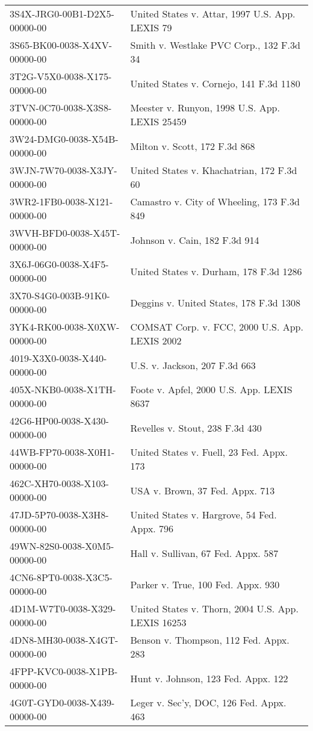 \documentclass[10pt, letterpaper]{article}
\begin{document}
\begin{spacing}{1.0}
\begin{longtable}{p{2.5in}p{4in}}
    3S4X-JRG0-00B1-D2X5-00000-00 & United States v. Attar, 1997 U.S. App. LEXIS 79\\
    3S65-BK00-0038-X4XV-00000-00 & Smith v. Westlake PVC Corp., 132 F.3d 34\\
    3T2G-V5X0-0038-X175-00000-00 & United States v. Cornejo, 141 F.3d 1180\\
    3TVN-0C70-0038-X3S8-00000-00 & Meester v. Runyon, 1998 U.S. App. LEXIS 25459\\
    3W24-DMG0-0038-X54B-00000-00 & Milton v. Scott, 172 F.3d 868\\
    3WJN-7W70-0038-X3JY-00000-00 & United States v. Khachatrian, 172 F.3d 60\\
    3WR2-1FB0-0038-X121-00000-00 & Camastro v. City of Wheeling, 173 F.3d 849\\
    3WVH-BFD0-0038-X45T-00000-00 & Johnson v. Cain, 182 F.3d 914\\
    3X6J-06G0-0038-X4F5-00000-00 & United States v. Durham, 178 F.3d 1286\\
    3X70-S4G0-003B-91K0-00000-00 & Deggins v. United States, 178 F.3d 1308\\
    3YK4-RK00-0038-X0XW-00000-00 & COMSAT Corp. v. FCC, 2000 U.S. App. LEXIS 2002\\
    4019-X3X0-0038-X440-00000-00 & U.S. v. Jackson, 207 F.3d 663\\
    405X-NKB0-0038-X1TH-00000-00 & Foote v. Apfel, 2000 U.S. App. LEXIS 8637\\
    42G6-HP00-0038-X430-00000-00 & Revelles v. Stout, 238 F.3d 430\\
    44WB-FP70-0038-X0H1-00000-00 & United States v. Fuell, 23 Fed. Appx. 173\\
    462C-XH70-0038-X103-00000-00 & USA v. Brown, 37 Fed. Appx. 713\\
    47JD-5P70-0038-X3H8-00000-00 & United States v. Hargrove, 54 Fed. Appx. 796\\
    49WN-82S0-0038-X0M5-00000-00 & Hall v. Sullivan, 67 Fed. Appx. 587\\
    4CN6-8PT0-0038-X3C5-00000-00 & Parker v. True, 100 Fed. Appx. 930\\
    4D1M-W7T0-0038-X329-00000-00 & United States v. Thorn, 2004 U.S. App. LEXIS 16253\\
    4DN8-MH30-0038-X4GT-00000-00 & Benson v. Thompson, 112 Fed. Appx. 283\\
    4FPP-KVC0-0038-X1PB-00000-00 & Hunt v. Johnson, 123 Fed. Appx. 122\\
    4G0T-GYD0-0038-X439-00000-00 & Leger v. Sec'y, DOC, 126 Fed. Appx. 463\\

\end{longtable}
\end{spacing}
\end{document}
